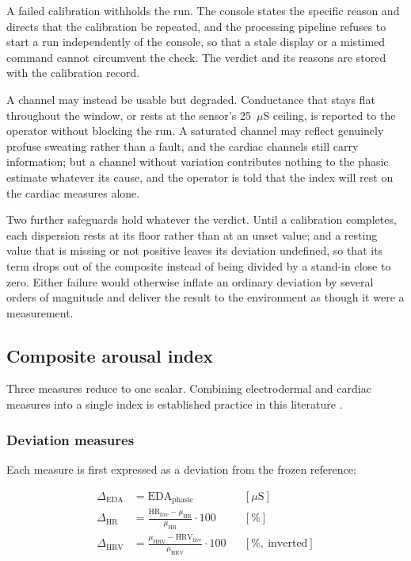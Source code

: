 A failed calibration withholds the run. The console states the
specific reason and directs that the calibration be repeated, and
the processing pipeline refuses to start a run independently of
the console, so that a stale display or a mistimed command cannot
circumvent the check. The verdict and its reasons are stored with
the calibration record.

A channel may instead be usable but degraded. Conductance that
stays flat throughout the window, or rests at the sensor's
25~$\mu$S ceiling, is reported to the operator without blocking
the run. A saturated channel may reflect genuinely profuse
sweating rather than a fault, and the cardiac channels still carry
information; but a channel without variation contributes nothing
to the phasic estimate whatever its cause, and the operator is
told that the index will rest on the cardiac measures alone.

Two further safeguards hold whatever the verdict. Until a
calibration completes, each dispersion rests at its floor rather
than at an unset value; and a resting value that is missing or not
positive leaves its deviation undefined, so that its term drops out
of the composite instead of being divided by a stand-in close to
zero. Either failure would otherwise inflate an ordinary deviation
by several orders of magnitude and deliver the result to the
environment as though it were a measurement.

\subsection{Composite arousal index}
\label{sec:composite}

Three measures reduce to one scalar. Combining electrodermal and
cardiac measures into a single index is established practice in
this literature \citep{alberdi2016, schmidt2018, kreibig2010}.

\subsubsection{Deviation measures}

Each measure is first expressed as a deviation from the frozen
reference:

\begin{align}
\Delta_{\mathrm{EDA}} &= \mathrm{EDA}_{\mathrm{phasic}}
&& [\mu\mathrm{S}] \\[2pt]
\Delta_{\mathrm{HR}} &= \frac{\mathrm{HR}_{\mathrm{live}} - \mu_{\mathrm{HR}}}
{\mu_{\mathrm{HR}}} \cdot 100 && [\%] \\[2pt]
\Delta_{\mathrm{HRV}} &= \frac{\mu_{\mathrm{HRV}} - \mathrm{HRV}_{\mathrm{live}}}
{\mu_{\mathrm{HRV}}} \cdot 100 && [\%,\ \text{inverted}]
\end{align}


